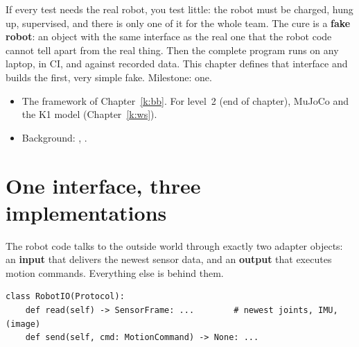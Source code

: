 \label{k:fake}

If every test needs the real robot, you test little: the robot must be charged, hung up, supervised, and there is only one of it for the whole team. The cure is a \textbf{fake robot}: an object with the same interface as the real one that the robot code cannot tell apart from the real thing. Then the complete program runs on any laptop, in CI, and against recorded data. This chapter defines that interface and builds the first, very simple fake. Milestone: one.

\begin{needbox}
\begin{itemize}[nosep]
  \item The framework of Chapter~\ref{k:bb}. For level~2 (end of chapter), MuJoCo and the K1 model (Chapter~\ref{k:ws}).
  \item Background: , .
\end{itemize}
\end{needbox}

\section*{One interface, three implementations}
The robot code talks to the outside world through exactly two adapter objects: an \textbf{input} that delivers the newest sensor data, and an \textbf{output} that executes motion commands. Everything else is behind them.
\begin{verbatim}
class RobotIO(Protocol):
    def read(self) -> SensorFrame: ...        # newest joints, IMU, (image)
    def send(self, cmd: MotionCommand) -> None: ...
\end{verbatim}
\begin{center}
\end{center}


